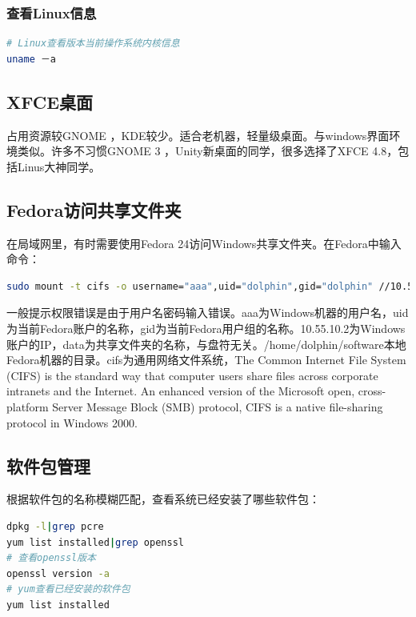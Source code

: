 \documentclass[letter]{book}
\begin{document}
\subsubsection{查看Linux信息}

\begin{lstlisting}[language=Bash]
# Linux查看版本当前操作系统内核信息
uname －a 
\end{lstlisting}

\subsection{XFCE桌面}

占用资源较GNOME ，KDE较少。适合老机器，轻量级桌面。与windows界面环境类似。许多不习惯GNOME 3 ，Unity新桌面的同学，很多选择了XFCE 4.8，包括Linus大神同学。

\subsection{Fedora访问共享文件夹}

在局域网里，有时需要使用Fedora 24访问Windows共享文件夹。在Fedora中输入命令：

\begin{lstlisting}[language=Bash]
sudo mount -t cifs -o username="aaa",uid="dolphin",gid="dolphin" //10.55.10.2/data /home/dolphin/software
\end{lstlisting}

一般提示权限错误是由于用户名密码输入错误。aaa为Windows机器的用户名，uid为当前Fedora账户的名称，gid为当前Fedora用户组的名称。10.55.10.2为Windows账户的IP，data为共享文件夹的名称，与盘符无关。/home/dolphin/software本地Fedora机器的目录。cifs为通用网络文件系统，The Common Internet File System (CIFS) is the standard way that computer users share files across corporate intranets and the Internet. An enhanced version of the Microsoft open, cross-platform Server Message Block (SMB) protocol, CIFS is a native file-sharing protocol in Windows 2000.


\subsection{软件包管理}

根据软件包的名称模糊匹配，查看系统已经安装了哪些软件包：

\begin{lstlisting}[language=Bash]
dpkg -l|grep pcre
yum list installed|grep openssl
# 查看openssl版本
openssl version -a
# yum查看已经安装的软件包
yum list installed
\end{lstlisting}
\end{document}
